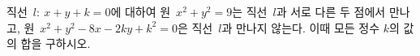 직선~$l:\ x+y+k=0$에 대하여 원~$x^2+y^2=9$는 직선~$l$과 서로 다른 두 점에서 만나고, 원~$x^2+y^2-8x-2ky+k^2=0$은 직선~$l$과 만나지 않는다. 이때 모든 정수 $k$의 값의 합을 구하시오.
